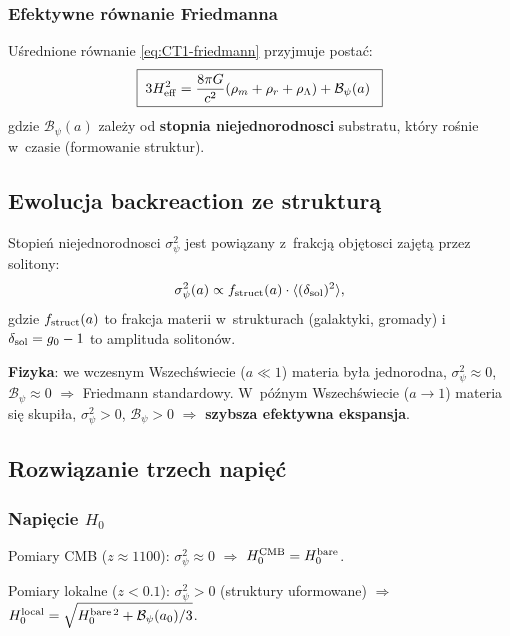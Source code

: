 \subsubsection{Efektywne r\'ownanie Friedmanna}

U\'srednione r\'ownanie \eqref{eq:CT1-friedmann} przyjmuje posta\'c:
\begin{equation}
  \boxed{\;
  3H_{\rm eff}^2
  = \frac{8\pi G}{c^2}\!\left(\rho_m + \rho_r + \rho_\Lambda\right)
    + \mathcal{B}_\psi(a)
  \;\;}
  \label{eq:CT1-friedmann-eff}
\end{equation}
gdzie $\mathcal{B}_\psi(a)$ zale\.zy od \textbf{stopnia niejednorodnosci}
substratu, kt\'ory ro\'snie w~czasie (formowanie struktur).

\subsection{Ewolucja backreaction ze struktur\k{a}}
\label{sec:CT1-evolution}

Stopie\'n niejednorodnosci $\sigma_\psi^2$ jest powi\k{a}zany z~frakcj\k{a}
obj\k{e}tosci zaj\k{e}t\k{a} przez solitony:
\begin{equation}
  \sigma_\psi^2(a) \propto f_{\rm struct}(a) \cdot \langle(\delta_{\rm sol})^2\rangle,
  \label{eq:CT1-sigma-struct}
\end{equation}
gdzie $f_{\rm struct}(a)$ to frakcja materii w~strukturach (galaktyki, gromady)
i~$\delta_{\rm sol} = g_0 - 1$ to amplituda soliton\'ow.

\textbf{Fizyka}: we wczesnym Wszech\'swiecie ($a \ll 1$) materia by\l{}a
jednorodna, $\sigma_\psi^2 \approx 0$, $\mathcal{B}_\psi \approx 0$
$\Rightarrow$ Friedmann standardowy.
W~p\'o\'znym Wszech\'swiecie ($a \to 1$) materia si\k{e} skupi\l{}a,
$\sigma_\psi^2 > 0$, $\mathcal{B}_\psi > 0$
$\Rightarrow$ \textbf{szybsza efektywna ekspansja}.

\subsection{Rozwi\k{a}zanie trzech napi\k{e}\'c}

\subsubsection{Napi\k{e}cie $H_0$}

Pomiary CMB ($z \approx 1100$): $\sigma_\psi^2 \approx 0$
$\Rightarrow$ $H_0^{\rm CMB} = H_0^{\rm bare}$.

Pomiary lokalne ($z < 0.1$): $\sigma_\psi^2 > 0$ (struktury uformowane)
$\Rightarrow$ $H_0^{\rm local} = \sqrt{H_0^{{\rm bare}\,2} + \mathcal{B}_\psi(a_0)/3}$.

